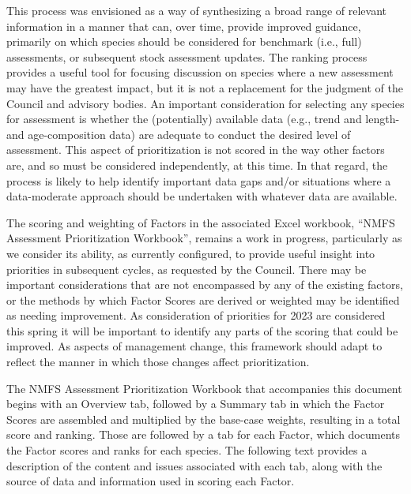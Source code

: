 \documentclass[11pt,
  english,
  a4paper,
]{article}
\begin{document}
This process was envisioned as a way of synthesizing a broad range of relevant information in a manner that can, over time, provide improved guidance, primarily on which species should be considered for benchmark (i.e., full) assessments, or subsequent stock assessment updates. The ranking process provides a useful tool for focusing discussion on species where a new assessment may have the greatest impact, but it is not a replacement for the judgment of the Council and advisory bodies. An important consideration for selecting any species for assessment is whether the (potentially) available data (e.g., trend and length- and age-composition data) are adequate to conduct the desired level of assessment. This aspect of prioritization is not scored in the way other factors are, and so must be considered independently, at this time. In that regard, the process is likely to help identify important data gaps and/or situations where a data-moderate approach should be undertaken with whatever data are available.

\leavevmode\tagmcend\tagstructend\par


The scoring and weighting of Factors in the associated Excel workbook, ``NMFS Assessment Prioritization Workbook'', remains a work in progress, particularly as we consider its ability, as currently configured, to provide useful insight into priorities in subsequent cycles, as requested by the Council. There may be important considerations that are not encompassed by any of the existing factors, or the methods by which Factor Scores are derived or weighted may be identified as needing improvement. As consideration of priorities for 2023 are considered this spring it will be important to identify any parts of the scoring that could be improved. As aspects of management change, this framework should adapt to reflect the manner in which those changes affect prioritization.

\leavevmode\tagmcend\tagstructend\par


The NMFS Assessment Prioritization Workbook that accompanies this document begins with an Overview tab, followed by a Summary tab in which the Factor Scores are assembled and multiplied by the base-case weights, resulting in a total score and ranking. Those are followed by a tab for each Factor, which documents the Factor scores and ranks for each species. The following text provides a description of the content and issues associated with each tab, along with the source of data and information used in scoring each Factor.
\end{document}
